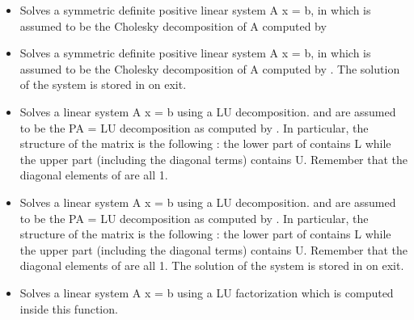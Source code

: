 \begin{itemize}
\item {} 
  \sshortdescribe Solves a symmetric definite positive linear system A x = b, 
  in which  is assumed to be the Cholesky decomposition of A
  computed by 

\item {} 
  \sshortdescribe Solves a symmetric definite positive linear system A x = b, 
  in which  is assumed to be the Cholesky decomposition of A
  computed by . The solution of the system is stored in
   on exit.

\item {} 
  \sshortdescribe Solves a linear system A x = b using a LU decomposition.
   and  are assumed to be the PA = LU decomposition as computed
  by . In particular, the structure of the matrix 
  is the following : the lower part of  contains L while the upper part
  (including the diagonal terms) contains U. Remember that the diagonal
  elements of  are all 1.

\item {} 
  \sshortdescribe Solves a linear system A x = b using a LU decomposition.
   and  are assumed to be the PA = LU decomposition as computed
  by . In particular, the structure of the matrix 
  is the following : the lower part of  contains L while the upper part
  (including the diagonal terms) contains U. Remember that the diagonal
  elements of  are all 1. The solution of the system is stored in 
  on exit.
  
\item {} 
  \sshortdescribe Solves a linear system A x = b using a LU factorization
  which is computed inside this function.


\end{itemize}
